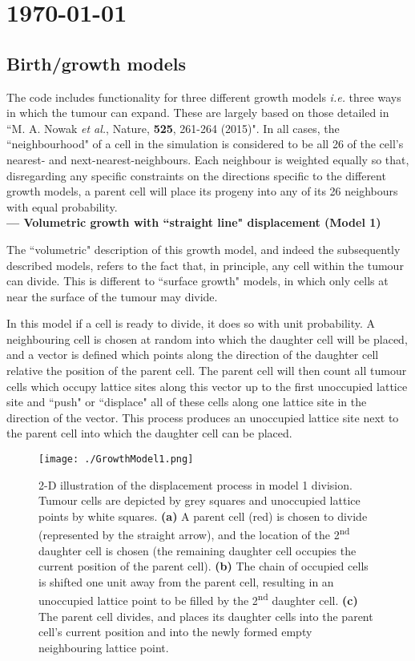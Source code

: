 \documentclass[12pt]{article}
\begin{document}
\section*{\today}
\subsection*{Birth/growth models}

The code includes functionality for three different growth models \textit{i.e.} three ways in which the tumour can expand. These are largely based on those detailed in ``M. A. Nowak \textit{et al.}, Nature, \textbf{525}, 261-264 (2015)". In all cases, the ``neighbourhood" of a cell in the simulation is considered to be all 26 of the cell's nearest- and next-nearest-neighbours. Each neighbour is weighted equally so that, disregarding any specific constraints on the directions specific to the different growth models, a parent cell will place its progeny into any of its 26 neighbours with equal probability. \\

\indent \textbf{--- Volumetric growth with ``straight line" displacement (Model 1)}

The ``volumetric" description of this growth model, and indeed the subsequently described models, refers to the fact that, in principle, any cell within the tumour can divide. This is different to ``surface growth" models, in which only cells at near the surface of the tumour may divide.

\indent In this model if a cell is ready to divide, it does so with unit probability. A neighbouring cell is chosen at random into which the daughter cell will be placed, and a vector is defined which points along the direction of the daughter cell relative the position of the parent cell. The parent cell will then count all tumour cells which occupy lattice sites along this vector up to the first unoccupied lattice site and ``push" or ``displace" all of these cells along one lattice site in the direction of the vector. This process produces an unoccupied lattice site next to the parent cell into which the daughter cell can be placed.\\
\begin{figure}[h!]
  \texttt{[image: ./GrowthModel1.png]}
  \caption{\small{2-D illustration of the displacement process in model 1 division. Tumour cells are depicted by grey squares and unoccupied lattice points by white squares. \textbf{(a)} A parent cell (red) is chosen to divide (represented by the straight arrow), and the location of the 2\textsuperscript{nd} daughter cell is chosen (the remaining daughter cell occupies the current position of the parent cell). \textbf{(b)} The chain of occupied cells is shifted one unit away from the parent cell, resulting in an unoccupied lattice point to be filled by the 2\textsuperscript{nd} daughter cell. \textbf{(c)} The parent cell divides, and places its daughter cells into the parent cell's current position and into the newly formed empty neighbouring lattice point.}}
  \label{fig:boat1}
\end{figure}
 
\end{document}
